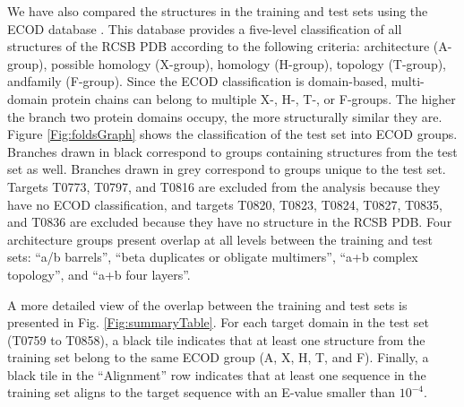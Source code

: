 We have also compared the structures in the training and test sets
using the ECOD database \cite{cheng2014ecod}. This database provides a
five-level classification of all structures of the RCSB
PDB \cite{berman2000protein} according to the following criteria:
architecture (A-group), possible homology (X-group), homology
(H-group), topology (T-group), andfamily (F-group).
%
Since the ECOD classification is domain-based, multi-domain protein
chains can belong to multiple X-, H-, T-, or F-groups.
%
The higher the branch two protein domains occupy, the more
structurally similar they are.  Figure \ref{Fig:foldsGraph} shows the
classification of the test set into ECOD groups. Branches drawn in
black correspond to groups containing structures from the test set as
well. Branches drawn in grey correspond to groups unique to the test
set. Targets T0773, T0797, and T0816 are excluded from the analysis
because they have no ECOD classification, and targets T0820, T0823,
T0824, T0827, T0835, and T0836 are excluded because they have no
structure in the RCSB PDB.
%
Four architecture groups present overlap at all levels between the
training and test sets: ``a/b barrels'', ``beta duplicates or obligate
multimers'', ``a+b complex topology'', and ``a+b four layers''.

A more detailed view of the overlap between the training and test sets
is presented in Fig. \ref{Fig:summaryTable}. For each target domain in
the test set (T0759 to T0858), a black tile indicates that at least
one structure from the training set belong to the same ECOD group (A,
X, H, T, and F).
%
%
Finally, a black tile in the ``Alignment'' row indicates that at least
one sequence in the training set aligns to the target sequence with an
E-value smaller than $10^{-4}$.

